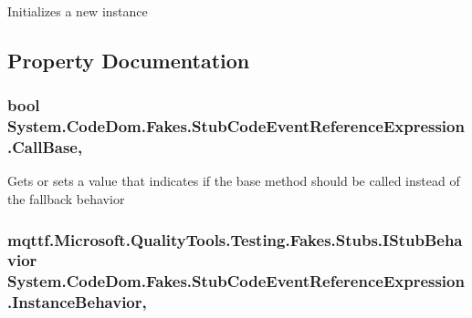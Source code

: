 Initializes a new instance



\subsection{Property Documentation}
\hypertarget{class_system_1_1_code_dom_1_1_fakes_1_1_stub_code_event_reference_expression_a2d76de9249d5fd41c6495fbfc2ca3695}{
\subsubsection[{Call\-Base}]{\setlength{\rightskip}{0pt plus 5cm}bool System.\-Code\-Dom.\-Fakes.\-Stub\-Code\-Event\-Reference\-Expression.\-Call\-Base\hspace{0.3cm}{\ttfamily [get]}, {\ttfamily [set]}}}\label{class_system_1_1_code_dom_1_1_fakes_1_1_stub_code_event_reference_expression_a2d76de9249d5fd41c6495fbfc2ca3695}


Gets or sets a value that indicates if the base method should be called instead of the fallback behavior

\hypertarget{class_system_1_1_code_dom_1_1_fakes_1_1_stub_code_event_reference_expression_a0d9fb1968698dd98213eef52d7e3e1ec}{
\subsubsection[{Instance\-Behavior}]{\setlength{\rightskip}{0pt plus 5cm}mqttf.\-Microsoft.\-Quality\-Tools.\-Testing.\-Fakes.\-Stubs.\-I\-Stub\-Behavior System.\-Code\-Dom.\-Fakes.\-Stub\-Code\-Event\-Reference\-Expression.\-Instance\-Behavior\hspace{0.3cm}{\ttfamily [get]}, {\ttfamily [set]}}}\label{class_system_1_1_code_dom_1_1_fakes_1_1_stub_code_event_reference_expression_a0d9fb1968698dd98213eef52d7e3e1ec}


